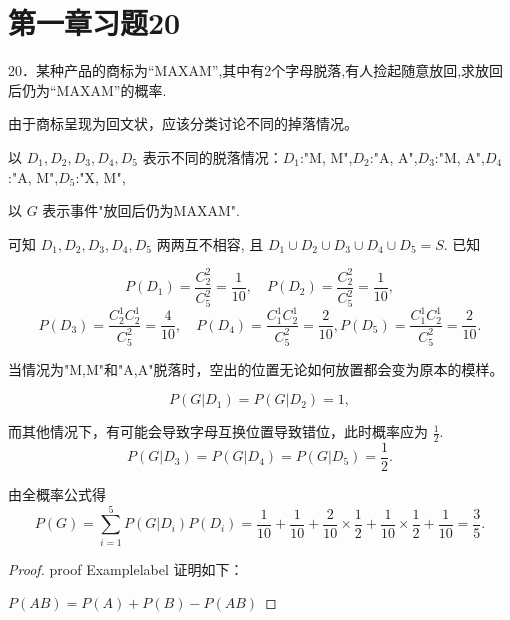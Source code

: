 \documentclass[twoside]{article}
\begin{document}
\section{第一章习题20}

20．某种产品的商标为“MAXAM”,其中有2个字母脱落,有人捡起随意放回,求放回后仍为“MAXAM”的概率.

\begin{ans}{5}{5}

由于商标呈现为回文状，应该分类讨论不同的掉落情况。

以 $D_1, D_2, D_3, D_4, D_5$ 表示不同的脱落情况：$D_1$:"M, M",$D_2$:"A, A",$D_3$:"M, A",$D_4$:"A, M",$D_5$:"X, M",

以 $G$ 表示事件"放回后仍为MAXAM".

可知 $D_1, D_2, D_3, D_4, D_5$ 两两互不相容, 且 $D_1 \cup D_2 \cup D_3 \cup D_4 \cup D_5 = S$. 已知

\[
P(D_1) = \frac{C_{2}^{2}}{C_{5}^{2}} = \frac{1}{10}, \quad P(D_2) = \frac{C_{2}^{2}}{C_{5}^{2}} = \frac{1}{10},
\]
\[
P(D_3) = \frac{C_{2}^{1} C_{2}^{1}}{C_{5}^{2}} = \frac{4}{10}, \quad P(D_4) = \frac{C_{1}^{1} C_{2}^{1}}{C_{5}^{2}} = \frac{2}{10}, P(D_5) = \frac{C_{1}^{1} C_{2}^{1}}{C_{5}^{2}} = \frac{2}{10}.
\]

当情况为"M,M"和"A,A"脱落时，空出的位置无论如何放置都会变为原本的模样。

\[
P(G|D_1) = P(G|D_2) = 1,
\]

而其他情况下，有可能会导致字母互换位置导致错位，此时概率应为 $\frac{1}{2}$. 
\[
P(G|D_3) = P(G|D_4) = P(G|D_5) = \frac{1}{2}.
\]

由全概率公式得
\[
P(G) = \sum_{i=1}^{5} P(G|D_i)P(D_i) = \frac{1}{10} + \frac{1}{10} + \frac{2}{10} \times \frac{1}{2} + \frac{1}{10} \times \frac{1}{2} + \frac{1}{10} = \frac{3}{5}.
\]

\end{ans}

\begin{proof}{proof Example}{label}
    证明如下：

    \( P(AB) = P(A) + P(B) - P(AB) \)
\end{proof}
\end{document}
